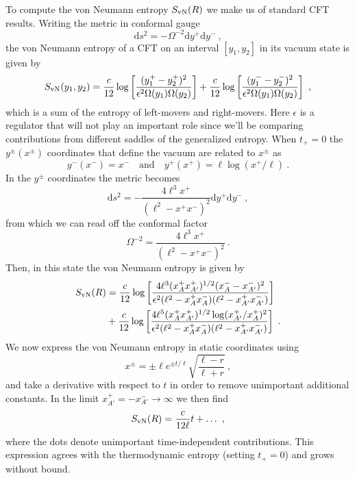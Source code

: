 \documentclass[a4paper,11pt]{article}
\newcommand{\beq}{\begin{equation}}
\newcommand{\eeq}{\end{equation}}
\newcommand{\bal}{\begin{aligned}}
\newcommand{\eal}{\end{aligned}}
\newcommand{\rmd}{\mathrm{d}}
\numberwithin{equation}{section}
\begin{document}
To compute the von Neumann entropy $S_{\rm vN}(R)$ we make us of standard CFT results. Writing the metric in conformal gauge
\beq
\rmd s^2 = -\Omega^{-2}\rmd y^+\rmd y^- ~,
\eeq
the von Neumann entropy of a CFT on an interval $[y_1,y_2]$ in its vacuum state is given by \cite{Fiola:1994ir,Almheiri:2019hni}
\beq \label{eq:vNgeneral}
S_{\rm vN}(y_1,y_2) = \frac c{12}\log\left[\frac{(y_1^+-y_2^+)^2}{\epsilon^2\Omega(y_1)\Omega(y_2)}\right]+\frac c{12}\log\left[\frac{(y_1^--y_2^-)^2}{\epsilon^2\Omega(y_1)\Omega(y_2)}\right] ~,
\eeq
which is a sum of the entropy of left-movers and right-movers. Here $\epsilon$ is a regulator that will not play an important role since we'll be comparing contributions from different saddles of the generalized entropy. When $t_+=0$ the $y^\pm(x^\pm)$ coordinates that define the vacuum are related to $x^{\pm}$ as
\beq
y^-(x^-) = x^- \quad \text{and} \quad y^+(x^+) = \ell \log(x^+/\ell)~.
\eeq
In the $y^\pm$ coordinates the metric becomes
\beq
\rmd s^2 = -\frac{4\ell^3x^+}{(\ell^2-x^+x^-)^2}\rmd y^+\rmd y^- ~,
\eeq
from which we can read off the conformal factor
\beq
\Omega^{-2} = \frac{4\ell^3 x^+}{(\ell^2-x^+x^-)^2} ~.
\eeq
Then, in this state the von Neumann entropy is given by
\beq \label{eq:vNRnoIsland}
\bal
S_{\rm vN}(R) &= \frac c{12}\log\left[\frac{4\ell^3(x^+_{A}x^+_{A'})^{1/2}(x_{A}^--x_{A'}^-)^2}{\epsilon^2(\ell^2-x_A^+x_A^-)(\ell^2-x_{A'}^+x_{A'}^-)}\right] \\ &+\frac c{12}\log\left[\frac{4\ell^5(x^+_{A}x^+_{A'})^{1/2}\log(x_{A'}^+/x_{A}^+)^2}{\epsilon^2(\ell^2-x_A^+x_A^-)(\ell^2-x_{A'}^+x_{A'}^-)}\right] ~.
\eal
\eeq
We now express the von Neumann entropy in static coordinates using
\beq
x^\pm = \pm\ell e^{\pm t/\ell}\sqrt{\frac{\ell-r}{\ell+r}} ~,
\eeq
and take a derivative with respect to $t$ in order to remove unimportant additional constants. In the limit $x_{A'}^+=-x_{A'}^-\to\infty$ we then find
\beq \label{eq:vNRsimple}
S_{\rm vN}(R) =\frac c{12\ell}t + \dots ~,
\eeq
where the dots denote unimportant time-independent contributions. This expression agrees with the thermodynamic entropy (setting $t_+=0$) and grows without bound.
\end{document}
